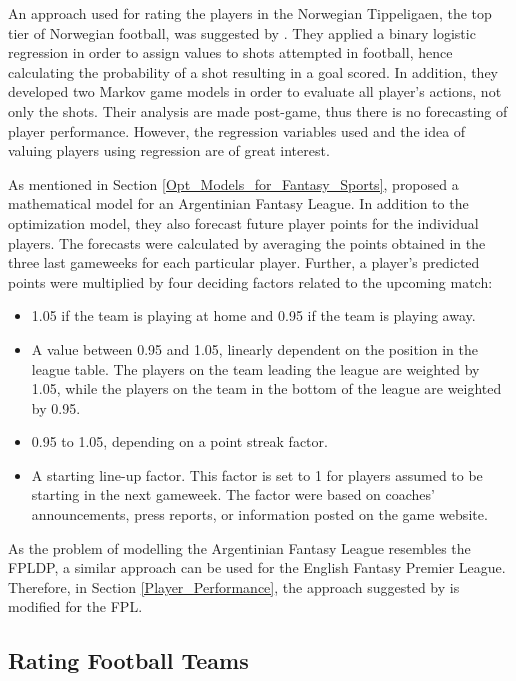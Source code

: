 \newpar

An approach used for rating the players in the Norwegian Tippeligaen, the top tier of Norwegian football, was suggested by \cite{vabo}. They applied a binary logistic regression in order to assign values to shots attempted in football, hence calculating the probability of a shot resulting in a goal scored. In addition, they developed two Markov game models in order to evaluate all player's actions, not only the shots. Their analysis are made post-game, thus there is no forecasting of player performance. However, the regression variables used and the idea of valuing players using regression are of great interest.

\newpar

As mentioned in Section \ref{Opt_Models_for_Fantasy_Sports}, \cite{Bonomo} proposed a mathematical model for an Argentinian Fantasy League. In addition to the optimization model, they also forecast future player points for the individual players. The forecasts were calculated by averaging the points obtained in the three last gameweeks for each particular player. Further, a player's predicted points were multiplied by four deciding factors related to the upcoming match:
\begin{itemize}
    \item 1.05 if the team is playing at home and 0.95 if the team is playing away.
    \item A value between 0.95 and 1.05, linearly dependent on the position in the league table. The players on the team leading the league are weighted by 1.05, while the players on the team in the bottom of the league are weighted by 0.95.
    \item 0.95 to 1.05, depending on a point streak factor.
    \item A starting line-up factor. This factor is set to 1 for players assumed to be starting in the next gameweek. The factor were based on coaches’ announcements, press reports, or information posted on the game website. 
\end{itemize}

As the problem of modelling the Argentinian Fantasy League resembles the FPLDP, a similar approach can be used for the English Fantasy Premier League. Therefore, in Section \ref{Player_Performance}, the approach suggested by \cite{Bonomo} is modified for the FPL.

\subsection{Rating Football Teams} \label{Strength_of_football_teams} 

